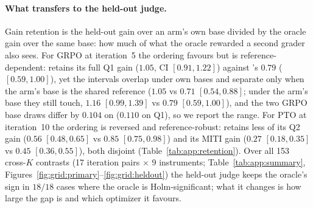 \paragraph{What transfers to the held-out judge.} Gain retention is the held-out gain over an
arm's own base divided by the oracle gain over the same base: how much of what the oracle
rewarded a second grader also sees. For GRPO at iteration~5 the ordering favours \Kf{} but is
reference-dependent: \Kf{} retains its full Q1 gain ($1.05$, CI $[0.91, 1.22]$) against \Kz{}'s
$0.79$ ($[0.59, 1.00]$), yet the intervals overlap under own bases and separate only when the
\Kf{} arm's base is the shared reference ($1.05$ vs $0.71$ $[0.54, 0.88]$; under the \Kz{} arm's
base they still touch, $1.16$ $[0.99, 1.39]$ vs $0.79$ $[0.59, 1.00]$), and the two GRPO base
draws differ by $0.104$ on \QQ{} ($0.110$ on Q1), so we report the range.
For PTO at iteration~10 the ordering is reversed and reference-robust: \Kf{} retains less of
its Q2 gain ($0.56$ $[0.48, 0.65]$ vs $0.85$ $[0.75, 0.98]$) and its MITI gain ($0.27$
$[0.18, 0.35]$ vs $0.45$ $[0.36, 0.55]$), both disjoint (Table~\ref{tab:app:retention}). Over
all 153 cross-$K$ contrasts (17 iteration pairs $\times$ 9 instruments;
Table~\ref{tab:app:summary}, Figures~\ref{fig:grid:primary}--\ref{fig:grid:heldout}) the
held-out judge keeps the oracle's sign in $18/18$ cases where the oracle is Holm-significant;
what it changes is how large the gap is and which optimizer it favours.
